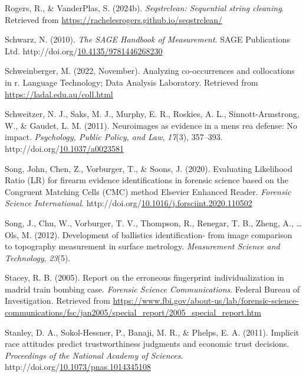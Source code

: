 \documentclass[print]{nuthesis}
\newlength{\cslhangindent}
\newenvironment{CSLReferences}[2]%
{\setlength{\parindent}{0pt}%
\everypar{\setlength{\hangindent}{\cslhangindent}}\ignorespaces}%
{\par}
\begin{document}
\begin{CSLReferences}{1}{0}
\leavevmode{}%
Rogers, R., \& VanderPlas, S. (2024b). \emph{Seqstrclean: Sequential string cleaning}. Retrieved from \url{https://rachelesrogers.github.io/seqstrclean/}

\leavevmode{}%
Schwarz, N. (2010). \emph{The {SAGE} {Handbook} of {Measurement}}. SAGE Publications Ltd. http://doi.org/\href{https://doi.org/10.4135/9781446268230}{10.4135/9781446268230}

\leavevmode{}%
Schweinberger, M. (2022, November). Analyzing co-occurrences and collocations in r. Language Technology; Data Analysis Laboratory. Retrieved from \url{https://ladal.edu.au/coll.html}

\leavevmode{}%
Schweitzer, N. J., Saks, M. J., Murphy, E. R., Roskies, A. L., Sinnott-Armstrong, W., \& Gaudet, L. M. (2011). Neuroimages as evidence in a mens rea defense: {No} impact. \emph{Psychology, Public Policy, and Law}, \emph{17}(3), 357--393. http://doi.org/\href{https://doi.org/10.1037/a0023581}{10.1037/a0023581}

\leavevmode{}%
Song, John, Chen, Z., Vorburger, T., \& Soons, J. (2020). Evaluating {Likelihood} {Ratio} ({LR}) for firearm evidence identifications in forensic science based on the {Congruent} {Matching} {Cells} ({CMC}) method {\textbar} {Elsevier} {Enhanced} {Reader}. \emph{Forensic Science International}. http://doi.org/\href{https://doi.org/10.1016/j.forsciint.2020.110502}{10.1016/j.forsciint.2020.110502}

\leavevmode{}%
Song, J., Chu, W., Vorburger, T. V., Thompson, R., Renegar, T. B., Zheng, A., \ldots{} Ols, M. (2012). Development of ballistics identification- from image comparison to topography measurement in surface metrology. \emph{Measurement Science and Technology}, \emph{23}(5).

\leavevmode{}%
Stacey, R. B. (2005). Report on the erroneous fingerprint individualization in madrid train bombing case. \emph{Forensic Science Communications}. {Federal Bureau of Investigation}. Retrieved from \url{https://www.fbi.gov/about-us/lab/forensic-science-communications/fsc/jan2005/special_report/2005_special_report.htm}

\leavevmode{}%
Stanley, D. A., Sokol-Hessner, P., Banaji, M. R., \& Phelps, E. A. (2011). Implicit race attitudes predict trustworthiness judgments and economic trust decisions. \emph{Proceedings of the National Academy of Sciences}. http://doi.org/\href{https://doi.org/10.1073/pnas.1014345108}{10.1073/pnas.1014345108}


\end{CSLReferences}
\end{document}
